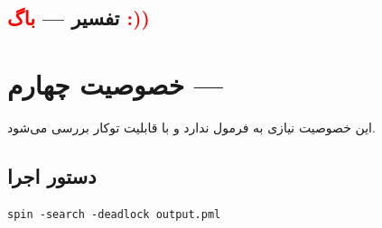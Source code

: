 \documentclass[12pt,a4paper]{article}
\begin{document}
\subsection{تفسیر --- \textcolor{red}{باگ :))}}
	
\section{خصوصیت چهارم --- } \label{sec:deadlock}
	این خصوصیت نیازی به فرمول  ندارد و با قابلیت توکار  بررسی می‌شود.
	
\subsection{دستور اجرا}
\begin{latin}
	\begin{lstlisting}[style=codestyle]
		spin -search -deadlock output.pml
	\end{lstlisting}
\end{latin}
\end{document}

